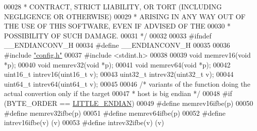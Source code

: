\begin{DoxyCode}
00028 \textcolor{comment}{ * CONTRACT, STRICT LIABILITY, OR TORT (INCLUDING NEGLIGENCE OR OTHERWISE)}
00029 \textcolor{comment}{ * ARISING IN ANY WAY OUT OF THE USE OF THIS SOFTWARE, EVEN IF ADVISED OF THE}
00030 \textcolor{comment}{ * POSSIBILITY OF SUCH DAMAGE.}
00031 \textcolor{comment}{ */}
00032 
00033 \textcolor{preprocessor}{#}\textcolor{preprocessor}{ifndef} \textcolor{preprocessor}{\_\_ENDIANCONV\_H}
00034 \textcolor{preprocessor}{#}\textcolor{preprocessor}{define} \textcolor{preprocessor}{\_\_ENDIANCONV\_H}
00035 
00036 \textcolor{preprocessor}{#}\textcolor{preprocessor}{include} \hyperlink{config_8h}{"config.h"}
00037 \textcolor{preprocessor}{#}\textcolor{preprocessor}{include} \textcolor{preprocessor}{<}\textcolor{preprocessor}{stdint}\textcolor{preprocessor}{.}\textcolor{preprocessor}{h}\textcolor{preprocessor}{>}
00038 
00039 \textcolor{keywordtype}{void} memrev16(\textcolor{keywordtype}{void} *p);
00040 \textcolor{keywordtype}{void} memrev32(\textcolor{keywordtype}{void} *p);
00041 \textcolor{keywordtype}{void} memrev64(\textcolor{keywordtype}{void} *p);
00042 uint16\_t intrev16(uint16\_t v);
00043 uint32\_t intrev32(uint32\_t v);
00044 uint64\_t intrev64(uint64\_t v);
00045 
00046 \textcolor{comment}{/* variants of the function doing the actual convertion only if the target}
00047 \textcolor{comment}{ * host is big endian */}
00048 \textcolor{preprocessor}{#}\textcolor{preprocessor}{if} \textcolor{preprocessor}{(}BYTE\_ORDER \textcolor{preprocessor}{==} \hyperlink{config_8h_a8782a401fbf55261460863fc2f8df1ce}{LITTLE\_ENDIAN}\textcolor{preprocessor}{)}
00049 \textcolor{preprocessor}{#}\textcolor{preprocessor}{define} \textcolor{preprocessor}{memrev16ifbe}\textcolor{preprocessor}{(}\textcolor{preprocessor}{p}\textcolor{preprocessor}{)}
00050 \textcolor{preprocessor}{#}\textcolor{preprocessor}{define} \textcolor{preprocessor}{memrev32ifbe}\textcolor{preprocessor}{(}\textcolor{preprocessor}{p}\textcolor{preprocessor}{)}
00051 \textcolor{preprocessor}{#}\textcolor{preprocessor}{define} \textcolor{preprocessor}{memrev64ifbe}\textcolor{preprocessor}{(}\textcolor{preprocessor}{p}\textcolor{preprocessor}{)}
00052 \textcolor{preprocessor}{#}\textcolor{preprocessor}{define} \textcolor{preprocessor}{intrev16ifbe}\textcolor{preprocessor}{(}\textcolor{preprocessor}{v}\textcolor{preprocessor}{)} \textcolor{preprocessor}{(}\textcolor{preprocessor}{v}\textcolor{preprocessor}{)}
00053 \textcolor{preprocessor}{#}\textcolor{preprocessor}{define} \textcolor{preprocessor}{intrev32ifbe}\textcolor{preprocessor}{(}\textcolor{preprocessor}{v}\textcolor{preprocessor}{)} \textcolor{preprocessor}{(}\textcolor{preprocessor}{v}\textcolor{preprocessor}{)}

\end{DoxyCode}
